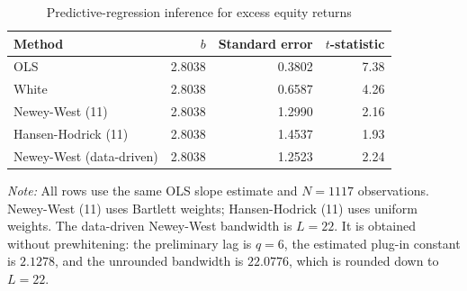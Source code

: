 \begin{table}[htbp]
\centering
\caption{Predictive-regression inference for excess equity returns}
\label{tab:q2b_standard_errors}
\begin{tabular}{lrrr}
\toprule
Method & $b$ & Standard error & $t$-statistic \\
\midrule
OLS & 2.8038 & 0.3802 & 7.38 \\
White & 2.8038 & 0.6587 & 4.26 \\
Newey-West (11) & 2.8038 & 1.2990 & 2.16 \\
Hansen-Hodrick (11) & 2.8038 & 1.4537 & 1.93 \\
Newey-West (data-driven) & 2.8038 & 1.2523 & 2.24 \\
\bottomrule
\end{tabular}
\begin{minipage}{0.92\textwidth}
\footnotesize\textit{Note:} All rows use the same OLS slope estimate and $N=1117$ observations. Newey-West (11) uses Bartlett weights; Hansen-Hodrick (11) uses uniform weights. The data-driven Newey-West bandwidth is $L=22$. It is obtained without prewhitening: the preliminary lag is $q=6$, the estimated plug-in constant is $2.1278$, and the unrounded bandwidth is $22.0776$, which is rounded down to $L=22$.
\end{minipage}
\end{table}
